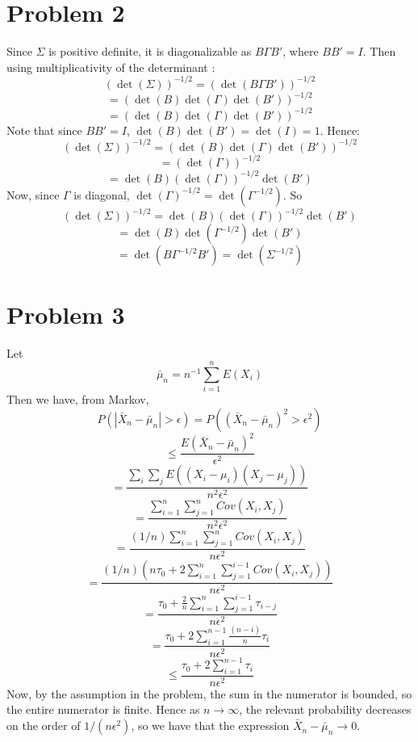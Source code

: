 \documentclass[10pt,letter]{article}
\begin{document}
\section*{Problem 2} Since $\Sigma$ is positive definite, it is diagonalizable as $B \Gamma B'$, where $B B' = I$. Then using multiplicativity of the determinant :
\[ (\det (\Sigma))^{-1/2} = (\det (B \Gamma B'))^{-1/2} \]
\[ = (\det(B) \det( \Gamma) \det(B'))^{-1/2} \]
\[ = (\det(B) \det( \Gamma) \det(B'))^{-1/2} \]
Note that since $B B' = I$, $\det(B) \det(B') = \det(I) = 1$. Hence:
\[ (\det (\Sigma))^{-1/2}= (\det(B) \det( \Gamma) \det(B'))^{-1/2} \]
\[ = (\det( \Gamma))^{-1/2} \]
\[ = \det(B) (\det( \Gamma))^{-1/2} \det(B') \]
Now, since $\Gamma$ is diagonal, $\det(\Gamma)^{-1/2} = \det(\Gamma^{-1/2})$. So
\[ (\det (\Sigma))^{-1/2} = \det(B) (\det( \Gamma))^{-1/2} \det(B') \]
\[ = \det(B)\det(\Gamma^{-1/2})\det(B') \]
\[ = \det(B\Gamma^{-1/2}B' ) = \det(\Sigma^{-1/2}) \]
\section*{Problem 3}
Let
\[ \bar{\mu}_n = n^{-1} \sum_{i=1}^n E(X_i) \]
Then we have, from Markov,
\[ P(|\bar{X}_n - \bar{\mu}_n| > \epsilon) = P((\bar{X}_n - \bar{\mu}_n)^2 > \epsilon^2) \]
\[ \le \frac{E(\bar{X}_n - \bar{\mu}_n)^2}{\epsilon^2} \]
\[ = \frac{\sum_i \sum_j E((X_i - \mu_i)(X_j - \mu_j))}{n^2\epsilon^2 } \]
\[ = \frac{\sum_{i=1}^n \sum_{j=1}^n Cov(X_i, X_j)}{n^2\epsilon^2 } \]
\[ = \frac{(1/n)\sum_{i=1}^n \sum_{j=1}^n Cov(X_i, X_j)}{n\epsilon^2 } \]
\[ = \frac{(1/n)\left(n\tau_0 + 2\sum_{i=1}^n \sum_{j=1}^{i-1} Cov(X_i, X_j)\right)}{n\epsilon^2 } \]
\[ = \frac{\tau_0 + \frac{2}{n}\sum_{i=1}^n \sum_{j=1}^{i-1} \tau_{i-j}}{n\epsilon^2 } \]
\[ = \frac{\tau_0 + 2 \sum_{i=1}^{n-1} \frac{(n-i)}{n}\tau_{i}}{n\epsilon^2 } \]
\[ \le \frac{\tau_0 + 2 \sum_{i=1}^{n-1} \tau_{i}}{n\epsilon^2 } \]
Now, by the assumption in the problem, the sum in the numerator is bounded, so the entire numerator is finite. Hence as $n \to \infty$, the relevant probability decreases on the order of $1/(n\epsilon^2)$, so we have that the expression $\bar{X}_n - \bar{\mu}_n \to  0$.
\end{document}
